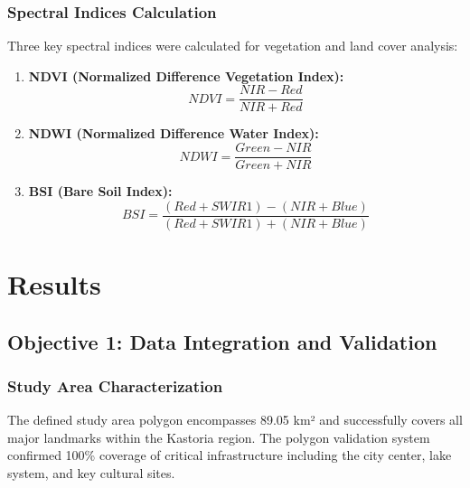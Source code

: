 \documentclass[a4paper,12pt]{article}
\begin{document}
\subsubsection{Spectral Indices Calculation}

Three key spectral indices were calculated for vegetation and land cover
analysis:

\begin{enumerate}
    \item \textbf{NDVI (Normalized Difference Vegetation Index):}
          \begin{equation}
              NDVI = \frac{NIR - Red}{NIR + Red}
          \end{equation}

    \item \textbf{NDWI (Normalized Difference Water Index):}
          \begin{equation}
              NDWI = \frac{Green - NIR}{Green + NIR}
          \end{equation}

    \item \textbf{BSI (Bare Soil Index):}
          \begin{equation}
              BSI = \frac{(Red + SWIR1) - (NIR + Blue)}{(Red + SWIR1) + (NIR + Blue)}
          \end{equation}
\end{enumerate}

\section{Results}

\subsection{Objective 1: Data Integration and Validation}

\subsubsection{Study Area Characterization}

The defined study area polygon encompasses 89.05 km² and successfully covers all
major landmarks within the Kastoria region. The polygon validation system
confirmed 100\% coverage of critical infrastructure including the city center,
lake system, and key cultural sites.
\end{document}
